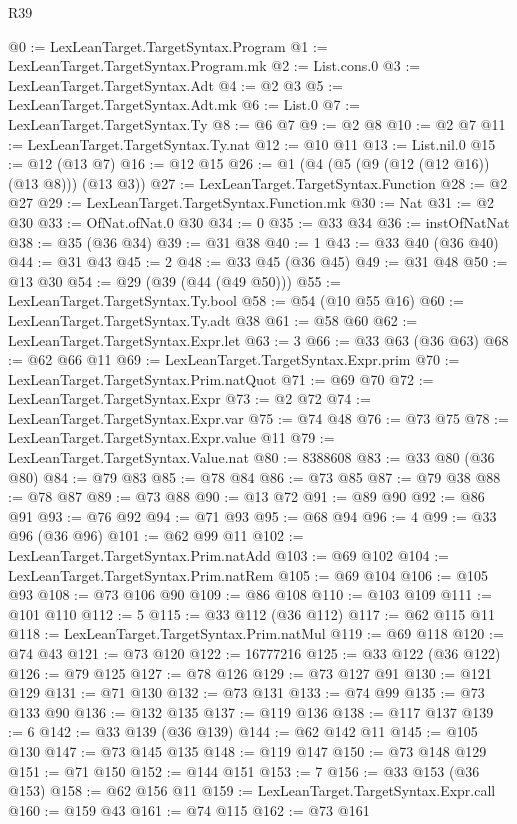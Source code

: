 \begin{lexlean}{R39}
\begin{coremodule}
@0 := LexLeanTarget.TargetSyntax.Program
@1 := LexLeanTarget.TargetSyntax.Program.mk
@2 := List.cons.{0}
@3 := LexLeanTarget.TargetSyntax.Adt
@4 := @2 @3
@5 := LexLeanTarget.TargetSyntax.Adt.mk
@6 := List.{0}
@7 := LexLeanTarget.TargetSyntax.Ty
@8 := @6 @7
@9 := @2 @8
@10 := @2 @7
@11 := LexLeanTarget.TargetSyntax.Ty.nat
@12 := @10 @11
@13 := List.nil.{0}
@15 := @12 (@13 @7)
@16 := @12 @15
@26 := @1 (@4 (@5 (@9 (@12 (@12 @16)) (@13 @8))) (@13 @3))
@27 := LexLeanTarget.TargetSyntax.Function
@28 := @2 @27
@29 := LexLeanTarget.TargetSyntax.Function.mk
@30 := Nat
@31 := @2 @30
@33 := OfNat.ofNat.{0} @30
@34 := 0
@35 := @33 @34
@36 := instOfNatNat
@38 := @35 (@36 @34)
@39 := @31 @38
@40 := 1
@43 := @33 @40 (@36 @40)
@44 := @31 @43
@45 := 2
@48 := @33 @45 (@36 @45)
@49 := @31 @48
@50 := @13 @30
@54 := @29 (@39 (@44 (@49 @50)))
@55 := LexLeanTarget.TargetSyntax.Ty.bool
@58 := @54 (@10 @55 @16)
@60 := LexLeanTarget.TargetSyntax.Ty.adt @38
@61 := @58 @60
@62 := LexLeanTarget.TargetSyntax.Expr.let
@63 := 3
@66 := @33 @63 (@36 @63)
@68 := @62 @66 @11
@69 := LexLeanTarget.TargetSyntax.Expr.prim
@70 := LexLeanTarget.TargetSyntax.Prim.natQuot
@71 := @69 @70
@72 := LexLeanTarget.TargetSyntax.Expr
@73 := @2 @72
@74 := LexLeanTarget.TargetSyntax.Expr.var
@75 := @74 @48
@76 := @73 @75
@78 := LexLeanTarget.TargetSyntax.Expr.value @11
@79 := LexLeanTarget.TargetSyntax.Value.nat
@80 := 8388608
@83 := @33 @80 (@36 @80)
@84 := @79 @83
@85 := @78 @84
@86 := @73 @85
@87 := @79 @38
@88 := @78 @87
@89 := @73 @88
@90 := @13 @72
@91 := @89 @90
@92 := @86 @91
@93 := @76 @92
@94 := @71 @93
@95 := @68 @94
@96 := 4
@99 := @33 @96 (@36 @96)
@101 := @62 @99 @11
@102 := LexLeanTarget.TargetSyntax.Prim.natAdd
@103 := @69 @102
@104 := LexLeanTarget.TargetSyntax.Prim.natRem
@105 := @69 @104
@106 := @105 @93
@108 := @73 @106 @90
@109 := @86 @108
@110 := @103 @109
@111 := @101 @110
@112 := 5
@115 := @33 @112 (@36 @112)
@117 := @62 @115 @11
@118 := LexLeanTarget.TargetSyntax.Prim.natMul
@119 := @69 @118
@120 := @74 @43
@121 := @73 @120
@122 := 16777216
@125 := @33 @122 (@36 @122)
@126 := @79 @125
@127 := @78 @126
@129 := @73 @127 @91
@130 := @121 @129
@131 := @71 @130
@132 := @73 @131
@133 := @74 @99
@135 := @73 @133 @90
@136 := @132 @135
@137 := @119 @136
@138 := @117 @137
@139 := 6
@142 := @33 @139 (@36 @139)
@144 := @62 @142 @11
@145 := @105 @130
@147 := @73 @145 @135
@148 := @119 @147
@150 := @73 @148 @129
@151 := @71 @150
@152 := @144 @151
@153 := 7
@156 := @33 @153 (@36 @153)
@158 := @62 @156 @11
@159 := LexLeanTarget.TargetSyntax.Expr.call
@160 := @159 @43
@161 := @74 @115
@162 := @73 @161

\end{coremodule}
\end{lexlean}
